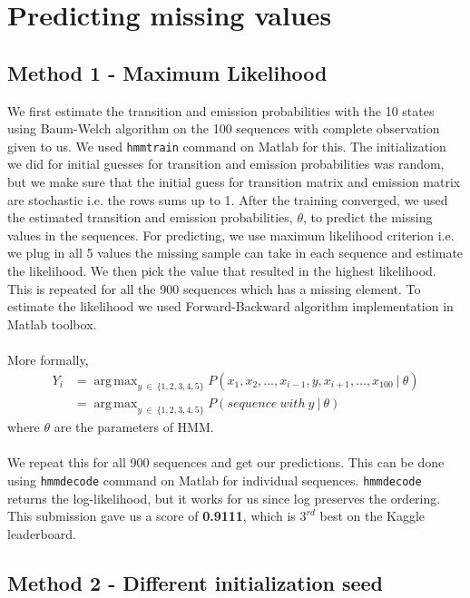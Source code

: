 \documentclass[12pt]{article}
\DeclareMathOperator*{\argmaxA}{arg\,max}
\begin{document}
\section*{Predicting missing values}
\subsection*{Method 1 - Maximum Likelihood}

We first estimate the transition and emission probabilities with the 10 states using Baum-Welch algorithm on the 100 sequences with complete observation given to us. We used \verb|hmmtrain| command on Matlab for this. The initialization we did for initial guesses for transition and emission probabilities was random, but we make sure that the initial guess for transition matrix and emission matrix are stochastic i.e. the rows sums up to 1. After the training converged, we used the estimated transition and emission probabilities, $\theta$, to predict the missing values in the sequences. For predicting, we use maximum likelihood criterion i.e. we plug in all 5 values the missing sample can take in each sequence and estimate the likelihood. We then pick the value that resulted in the highest likelihood. This is repeated for all the 900 sequences which has a missing element. To estimate the likelihood we used Forward-Backward algorithm implementation in Matlab toolbox.\\
\\
More formally,
\begin{align*}
Y_{i} &= \argmaxA_{y \ \in \ \{1,2,3,4,5\} } P(x_{1}, x_{2}, \dots , x_{i-1}, y, x_{i+1}, \dots , x_{100} \ | \ \theta) \\
&= \argmaxA_{y \ \in \  \{1,2,3,4,5\} } P(sequence\ with\ y  \ | \ \theta) 
\end{align*}
where $\theta$ are the parameters of HMM.\\
\\
We repeat this for all 900 sequences and get our predictions. This can be done using  \verb|hmmdecode| command on Matlab for individual sequences. \verb|hmmdecode| returns the log-likelihood, but it works for us since log preserves the ordering. This submission gave us a score of \textbf{0.9111}, which is $3^{rd}$ best on the Kaggle leaderboard.

\subsection*{Method 2 - Different initialization seed}
\end{document}
